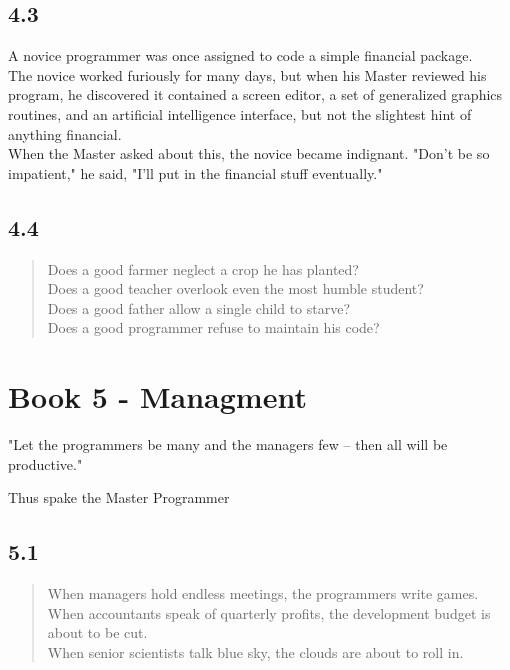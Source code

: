 \documentclass[14pt, letterpaper]{book}
\begin{document}
\section*{4.3}
A novice programmer was once assigned to code a simple financial package.\\

The novice worked furiously for many days, but when his Master reviewed his program, he discovered it contained a screen editor, a set of generalized graphics routines, and an artificial intelligence interface, but not the slightest hint of anything financial.\\

When the Master asked about this, the novice became indignant. "Don't be so impatient," he said, "I'll put in the financial stuff eventually."\\

\section*{4.4}
\begin{verse}
    Does a good farmer neglect a crop he has planted? \\
    Does a good teacher overlook even the most humble student? \\
    Does a good father allow a single child to starve? \\
    Does a good programmer refuse to maintain his code?\\
\end{verse}

\chapter*{Book 5 - Managment}
\epigraph{"Let the programmers be many and the managers few -- then all will be productive."}{Thus spake the Master Programmer}

\section*{5.1}

\begin{verse}
When managers hold endless meetings, the programmers write games. \\
When accountants speak of quarterly profits, the development budget is about to be cut. \\
When senior scientists talk blue sky, the clouds are about to roll in.\\
\end{verse}
\end{document}
